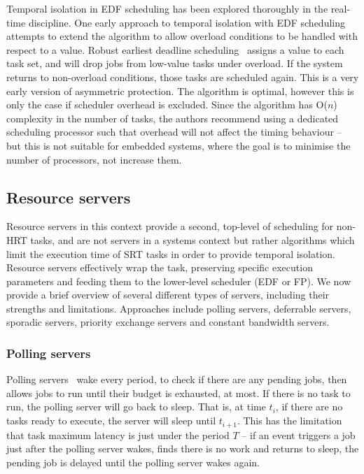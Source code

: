 Temporal isolation in \gls{EDF} scheduling has been explored thoroughly in the real-time discipline.
One early approach to temporal isolation with \gls{EDF} scheduling attempts to extend the 
algorithm to allow overload conditions to be handled with respect to a value. Robust earliest deadline
scheduling~\citep{Buttazzo_Stankovic_93} assigns a value to each task set, and will drop jobs from
low-value tasks under overload. If the system returns to non-overload conditions, those tasks are
scheduled again. This is a very early version of asymmetric protection.
The algorithm is optimal, however this is only the case if
scheduler overhead is excluded.  Since the algorithm has O($n$) complexity in the number of
tasks, the authors recommend using a dedicated scheduling processor such that overhead will not
affect the timing behaviour -- but this is not suitable for embedded systems, where the goal is to
minimise the number of processors, not increase them.

\subsection{Resource servers}

Resource servers in this context provide a second, top-level of scheduling for
non-\gls{HRT} tasks, and are not servers in a systems context but rather algorithms which limit the
execution time of \gls{SRT} tasks in order to provide temporal isolation. Resource servers
effectively wrap the task, preserving specific execution parameters and feeding them to the
lower-level scheduler (\gls{EDF} or \gls{FP}). We now provide a brief
overview of several different types of servers, including their strengths and limitations. 
Approaches include polling servers, deferrable servers, sporadic servers, priority exchange servers
and constant bandwidth servers. 

\subsubsection{Polling servers}
\label{p:polling-servers}

Polling servers~\citep{Lehoczky_LS_87} wake every period, 
to check if there are any pending jobs, then allows jobs to run until their budget is exhausted, at most. If there is no
task to run, the polling server will go back to sleep. That is, at time $t_{i}$, if there are no
tasks ready to execute, the server will sleep until $t_{i+1}$. This has the limitation that task
maximum latency
is just under the period $T$ -- if an event triggers a job just after the polling server wakes,
finds there is no work and returns to sleep, the pending job is delayed until the polling server
wakes again. 

